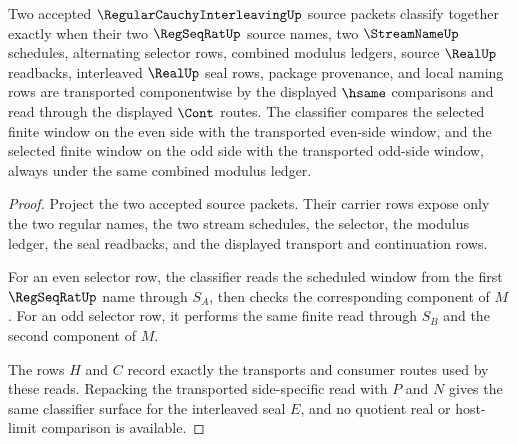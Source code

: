 \begin{theorem}
\label{thm:regular-cauchy-interleaving-classifier}
Two accepted $\RegularCauchyInterleavingUp$ source packets classify together exactly when their two $\RegSeqRatUp$ source names, two $\StreamNameUp$ schedules, alternating selector rows, combined modulus ledgers, source $\RealUp$ readbacks, interleaved $\RealUp$ seal rows, package provenance, and local naming rows are transported componentwise by the displayed $\hsame$ comparisons and read through the displayed $\Cont$ routes. The classifier compares the selected finite window on the even side with the transported even-side window, and the selected finite window on the odd side with the transported odd-side window, always under the same combined modulus ledger.
\end{theorem}
\begin{proof}
Project the two accepted source packets. Their carrier rows expose only the two regular names, the two stream schedules, the selector, the modulus ledger, the seal readbacks, and the displayed transport and continuation rows.

For an even selector row, the classifier reads the scheduled window from the first $\RegSeqRatUp$ name through $S_A$, then checks the corresponding component of $M$. For an odd selector row, it performs the same finite read through $S_B$ and the second component of $M$.

The rows $H$ and $C$ record exactly the transports and consumer routes used by these reads. Repacking the transported side-specific read with $P$ and $N$ gives the same classifier surface for the interleaved seal $E$, and no quotient real or host-limit comparison is available.
\end{proof}

